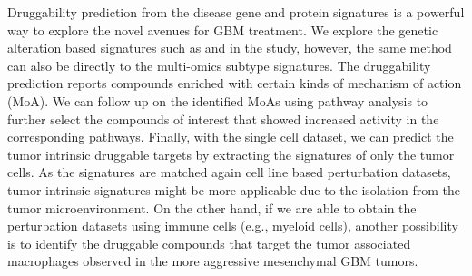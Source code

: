 Druggability prediction from the disease gene and protein signatures is a powerful way to explore the novel avenues for GBM treatment. We explore the genetic alteration based signatures such as  and  in the study, however, the same method can also be directly to the multi-omics subtype signatures. The druggability prediction reports compounds enriched with certain kinds of mechanism of action (MoA). We can follow up on the identified MoAs using pathway analysis to further select the compounds of interest that showed increased activity in the corresponding pathways. Finally, with the single cell dataset, we can predict the tumor intrinsic druggable targets by extracting the signatures of only the tumor cells. As the signatures are matched again cell line based perturbation datasets, tumor intrinsic signatures might be more applicable due to the isolation from the tumor microenvironment. On the other hand, if we are able to obtain the perturbation datasets using immune cells (e.g., myeloid cells), another possibility is to identify the druggable compounds that target the tumor associated macrophages observed in the more aggressive mesenchymal GBM tumors.
